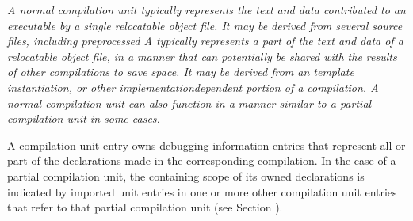 \textit{A normal compilation unit typically represents the text and
data contributed to an executable by a single relocatable
object file. It may be derived from several source files,
including pre\dash processed  
A  typically represents a part of the text
and data of a relocatable object file, in a manner that can
potentially be shared with the results of other compilations
to save space. It may be derived from an 
template instantiation, or other implementation\dash dependent
portion of a compilation. A normal compilation unit can also
function in a manner similar to a partial compilation unit
in some cases.}

A compilation unit entry owns debugging information
entries that represent all or part of the declarations
made in the corresponding compilation. In the case of a
partial compilation unit, the containing scope of its owned
declarations is indicated by imported unit entries in one
or more other compilation unit entries that refer to that
partial compilation unit (see 
Section ).


